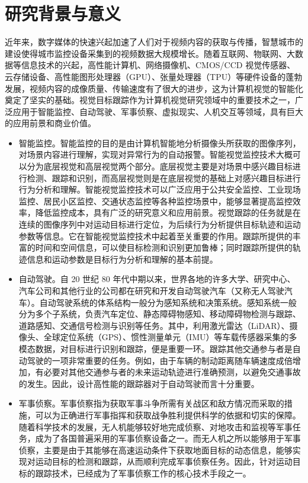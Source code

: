 \section{研究背景与意义}
近年来，数字媒体的快速兴起加速了人们对于视频内容的获取与传播，智慧城市的建设使得城市监控设备采集到的视频数据大规模增长。随着互联网、物联网、大数据等信息技术的兴起，高性能计算机、网络摄像机、CMOS/CCD 视觉传感器、云存储设备、高性能图形处理器（GPU）、张量处理器（TPU）等硬件设备的蓬勃发展，视频内容的成像质量、传输速度有了很大的进步，这为计算机视觉的智能化奠定了坚实的基础。视觉目标跟踪作为计算机视觉研究领域中的重要技术之一，广泛应用于智能监控、自动驾驶、军事侦察、虚拟现实、人机交互等领域，具有巨大的应用前景和商业价值。
\begin{itemize}
\item 智能监控。智能监控的目的是由计算机智能地分析摄像头所获取的图像序列，对场景内容进行理解，实现对异常行为的自动报警。智能视觉监控技术大概可以分为底层视觉和高层视觉两个部分。底层视觉主要是对场景中感兴趣目标进行检测、跟踪和识别，而高层视觉则是在底层视觉的基础上对感兴趣目标进行行为分析和理解。智能视觉监控技术可以广泛应用于公共安全监控、工业现场监控、居民小区监控、交通状态监控等各种监控场景中，能够显著提高监控效率，降低监控成本，具有广泛的研究意义和应用前景。视觉跟踪的任务就是在连续的图像序列中对运动目标进行定位，为后续行为分析提供目标轨迹和运动参数等信息。它在智能视觉监控技术中起着至关重要的作用。跟踪所提供的丰富的时间和空间信息，可以使目标检测和识别更加鲁棒；同时跟踪所提供的轨迹信息和运动参数是目标行为分析和理解的基本前提。
\item 自动驾驶。自 20 世纪 80 年代中期以来，世界各地的许多大学、研究中心、汽车公司和其他行业的公司都在研究和开发自动驾驶汽车（又称无人驾驶汽车）。自动驾驶系统的体系结构一般分为感知系统和决策系统。感知系统一般分为多个子系统，负责汽车定位、静态障碍物感知、移动障碍物检测与跟踪、道路感知、交通信号检测与识别等任务。其中，利用激光雷达（LiDAR）、摄像头、全球定位系统（GPS）、惯性测量单元（IMU）等车载传感器采集的多模态数据，对目标进行识别和跟踪，便是重要一环。跟踪其他交通参与者是自动驾驶的一项非常重要的任务。例如，由于车辆的制动距离随车辆速度成倍增加，有必要对其他交通参与者的未来运动轨迹进行准确预测，以避免交通事故的发生。因此，设计高性能的跟踪器对于自动驾驶而言十分重要。%
\item 军事侦察。军事侦察指为获取军事斗争所需有关战区和敌方情况而采取的措施，可以为正确进行军事指挥和获取战争胜利提供科学的依据和切实的保障。随着科学技术的发展，无人机能够较好地完成侦察、对地攻击和监视等军事任务，成为了各国普遍采用的军事侦察设备之一。而无人机之所以能够用于军事侦察，主要是由于其能够在高速运动条件下获取地面目标的动态信息，能够实现对运动目标的检测和跟踪，从而顺利完成军事侦察任务。因此，针对运动目标的跟踪技术，已经成为了军事侦察工作的核心技术手段之一。
\end{itemize}

